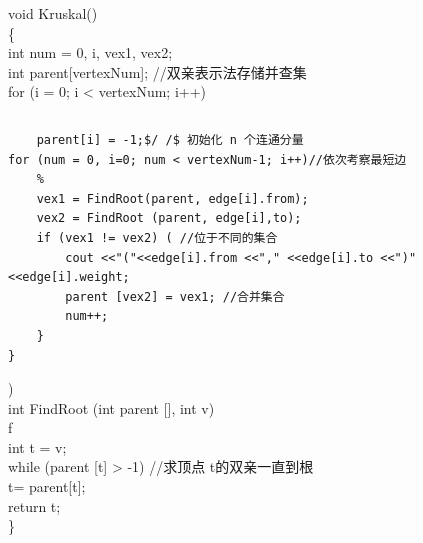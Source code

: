 \documentclass[10pt]{article}
\begin{document}
void Kruskal()\\
\{\\
int num = 0, i, vex1, vex2;\\[0pt]
int parent[vertexNum]; //双亲表示法存储并查集\\
for (i = 0; i < vertexNum; i++)

\begin{verbatim}

\end{verbatim}

\begin{verbatim}
    parent[i] = -1;$/ /$ 初始化 n 个连通分量
for (num = 0, i=0; num < vertexNum-1; i++)//依次考察最短边
    %
    vex1 = FindRoot(parent, edge[i].from);
    vex2 = FindRoot (parent, edge[i],to);
    if (vex1 != vex2) ( //位于不同的集合
        cout <<"("<<edge[i].from <<"," <<edge[i].to <<")" <<edge[i].weight;
        parent [vex2] = vex1; //合并集合
        num++;
    }
}
\end{verbatim}

)\\[0pt]
int FindRoot (int parent [], int v)\\
f\\
int t = v;\\[0pt]
while (parent [t] > -1) //求顶点 t的双亲一直到根\\[0pt]
t= parent[t];\\
return t;\\
\}
\end{document}
